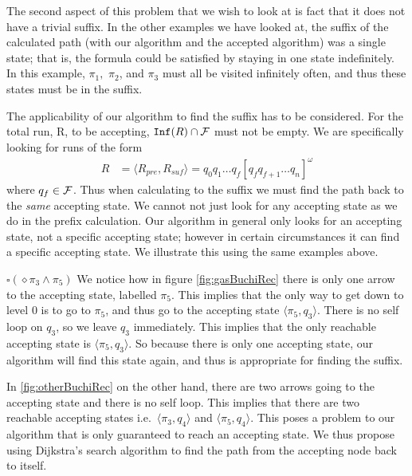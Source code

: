 The second aspect of this problem that we wish to look at is fact that it does not have a trivial suffix. In the other examples we have looked at, the suffix of the calculated path (with our algorithm and the accepted algorithm) was a single state; that is, the formula could be satisfied by staying in one state indefinitely. In this example, $\pi_1,$ $\pi_2$, and $\pi_3$ must all be visited infinitely often, and thus these states must be in the suffix. 

The applicability of our algorithm to find the suffix has to be considered. For the total run, R, to be accepting, $\texttt{Inf}(R) \cap \mathcal{F}$ must not be empty. We are specifically looking for runs of the form 
\begin{align*}
R &= \langle R_{pre}, R_{suf} \rangle = q_0 q_1 \dots q_f [q_f q_{f+1} \dots q_n]^\omega
\end{align*}     
where $q_f \in \mathcal{F}$. Thus when calculating to the suffix we must find the path back to the \textit{same} accepting state. We cannot not just look for any accepting state as we do in the prefix calculation. Our algorithm in general only looks for an accepting state, not a specific accepting state; however in certain circumstances it can find a specific accepting state. We illustrate this using the same examples above. 

$\square (\diamond \pi_3 \wedge \pi_5)$ 
We notice how in figure \ref{fig:gasBuchiRec} there is only one arrow to the accepting state, labelled $\pi_5$. This implies that the only way to get down to level 0 is to go to $\pi_5$, and thus go to the accepting state $\langle \pi_5, q_3 \rangle$. There is no self loop on $q_3$, so we leave $q_3$ immediately. This implies that the only reachable accepting state is $\langle \pi_5, q_3 \rangle$. So because there is only one accepting state, our algorithm will find this state again, and thus is appropriate for finding the suffix. 

In \ref{fig:otherBuchiRec} on the other hand, there are two arrows going to the accepting state and there is no self loop. This implies that there are two reachable accepting states i.e.\ $\langle \pi_3, q_4 \rangle$ and $\langle \pi_5, q_4 \rangle$. This poses a problem to our algorithm that is only guaranteed to reach an accepting state. We thus propose using Dijkstra's search algorithm to find the path from the accepting node back to itself.   
